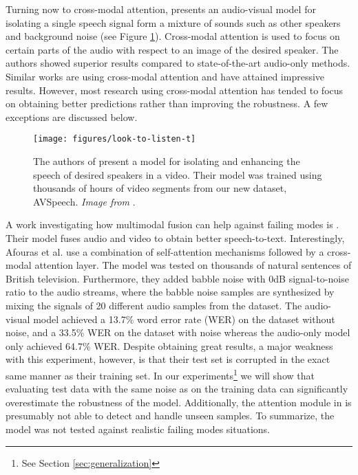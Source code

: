 Turning now to cross-modal attention, \citep{looking-to-listen} presents an audio-visual model for isolating a single speech signal form a mixture of sounds such as other speakers and background noise (see Figure \ref{fig:looking-to-listen}). Cross-modal attention is used to focus on certain parts of the audio with respect to an image of the desired speaker. The authors showed superior results compared to state-of-the-art audio-only methods. Similar works \citep{cross-transformer, crossmodal-object-detection, crossmodal-video-caption} are using cross-modal attention and have attained impressive results. However, most research using cross-modal attention has tended to focus on obtaining better predictions rather than improving the robustness. A few exceptions are discussed below.
\begin{figure}[!ht]
\centering
\texttt{[image: figures/look-to-listen-t]}
\caption[Looking to Listen framework]{The authors of \citep{looking-to-listen} present a model for isolating and enhancing the speech of desired speakers in a video. Their model was trained using thousands of hours of video segments from our new dataset, AVSpeech. \textit{Image from} \citep{looking-to-listen}.}
\label{fig:looking-to-listen}
\end{figure}

A work investigating how multimodal fusion can help against failing modes is \citep{afouras}. Their model fuses audio and video to obtain better speech-to-text. Interestingly, Afouras et al. use a combination of self-attention mechanisms followed by a cross-modal attention layer. The model was tested on thousands of natural sentences of British television. Furthermore, they added babble noise with 0dB signal-to-noise ratio to the audio streams, where the babble noise samples are synthesized by mixing the signals of 20 different audio samples from the dataset. The audio-visual model achieved a 13.7\% word error rate (WER) on the dataset without noise, and a 33.5\% WER on the dataset with noise whereas the audio-only model only achieved 64.7\% WER. Despite obtaining great results, a major weakness with this experiment, however, is that their test set is corrupted in the exact same manner as their training set. In our experiments\footnote{See Section \ref{sec:generalization}} we will show that evaluating test data with the same noise as on the training data can significantly overestimate the robustness of the model. Additionally, the attention module in \citep{afouras} is presumably not able to detect and handle unseen samples. To summarize, the model was not tested against realistic failing modes situations.


